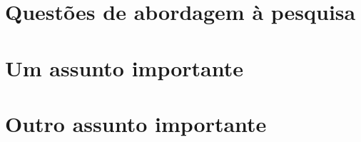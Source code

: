 \documentclass[
12pt,					%
openright,				%
twoside,				%
a4paper,				%
english,
brazil
]{ABNT/abntex2_report}
\begin{document}
	\begin{flushleft}
	\ABNTEXchapterfont\Large\textbf{\MakeUppercase\listadesimbolsabrevtitlename}
		\noindent
		\vspace*{-06pt}
		\normalsize
		\normalfont
		\aclist[list=acronyms]
	\end{flushleft}
	\newpage
	\begin{flushleft}
		\ABNTEXchapterfont\Large\textbf{\MakeUppercase\glosariotitlename}
	\end{flushleft}
	\vspace*{-36pt}
	\normalsize
	\normalfont
	\tableofcontents*
	\justify
	\setlength\beforechapskip{-24pt}
	\setlength\afterchapskip{12pt}
	\textual
	\pagestyle{plain}
	\normalsize
	\justify
	\normalfont
	
	
	
	
	
	
	
	\cleardoublepage
	\titleformat{\chapter}[display]{\vspace*{-24pt}\ABNTEXchapterfont\large\bfseries}{\chaptertitlename\ \thechapter}{12pt}{\Large}
	
	\apendices
	\justify
	\chapter{Questões de abordagem à pesquisa}
	\label{apend:quest}
	\lipsum[1] %
	\chapter{Um assunto importante}
	\label{apend:assunto}
	\lipsum[1] %
	

	\anexos
	\justify
	\chapter{Outro assunto importante}
	\label{ann:relant}
	\lipsum[1] %
\end{document}
